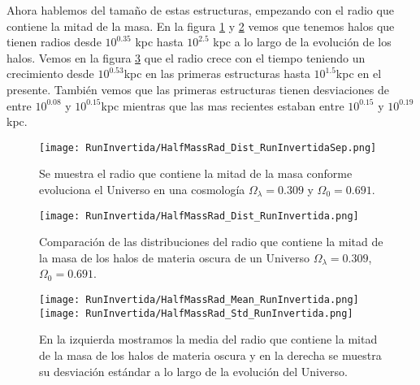 Ahora hablemos del tamaño de estas estructuras, empezando con el radio que contiene la mitad de la masa. En la figura \ref{fig:Invertida-HalfMassRadDistSep} y \ref{fig:Invertida-HalfMassRadDist} vemos que tenemos halos que tienen radios desde $10^{0.35}$ kpc hasta $10^{2.5}$ kpc a lo largo de la evolución de los halos. Vemos en la figura \ref{fig:Invertida-HalfMassRadStats} que el radio crece con el tiempo teniendo un crecimiento desde $10^{0.53}$kpc en las primeras estructuras hasta $10^{1.5}$kpc en el presente. También vemos que las primeras estructuras tienen desviaciones de entre $10^{0.08}$ y $10^{0.15}$kpc mientras que las mas recientes estaban entre $10^{0.15}$ y $10^{0.19}$ kpc.

\begin{figure}[H]
    \centering
    \texttt{[image: RunInvertida/HalfMassRad\_Dist\_RunInvertidaSep.png]}
    \caption[Radio que contiene la mitad de la masa en la evolución de un Universo $\Omega_\lambda = 0.309 $, $\Omega_0 = 0.691$]{\footnotesize Se muestra el radio que contiene la mitad de la masa conforme evoluciona el Universo en una cosmología $\Omega_\lambda = 0.309 $ y $\Omega_0 = 0.691$.}
    \label{fig:Invertida-HalfMassRadDistSep}
\end{figure}

\begin{figure}[H]
    \centering
    \texttt{[image: RunInvertida/HalfMassRad\_Dist\_RunInvertida.png]}
    \caption[Distribución del Radio que contiene la mitad de la masa de un Universo $\Omega_\lambda = 0.309 $, $\Omega_0 = 0.691$]{\footnotesize Comparación de las distribuciones del radio que contiene la mitad de la masa de los halos de materia oscura de un Universo $\Omega_\lambda = 0.309 $, $\Omega_0 = 0.691$.}
    \label{fig:Invertida-HalfMassRadDist}
\end{figure}

\begin{figure}[H]
    \centering
    \texttt{[image: RunInvertida/HalfMassRad\_Mean\_RunInvertida.png]}
    \texttt{[image: RunInvertida/HalfMassRad\_Std\_RunInvertida.png]}
    \caption[Media y desviación estándar del radio de la mitad de la masa de un Universo $\Omega_\lambda = 0.309 $, $\Omega_0 = 0.691$]{\footnotesize En la izquierda mostramos la media del radio que contiene la mitad de la masa de los halos de materia oscura y en la derecha se muestra su desviación estándar a lo largo de la evolución del Universo.}
    \label{fig:Invertida-HalfMassRadStats}
\end{figure}

